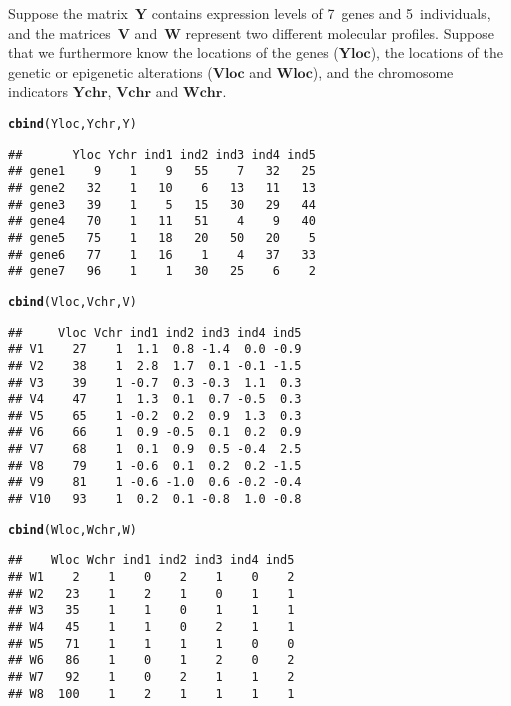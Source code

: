 \documentclass{article}\usepackage[]{graphicx}\usepackage[]{color}
\makeatletter
\newcommand{\hlstd}[1]{\textcolor[rgb]{0.345,0.345,0.345}{#1}}%
\newcommand{\hlkwd}[1]{\textcolor[rgb]{0.737,0.353,0.396}{\textbf{#1}}}%
\newenvironment{kframe}{%
 \def\at@end@of@kframe{}%
 \ifinner\ifhmode%
  \def\at@end@of@kframe{\end{minipage}}%
  \begin{minipage}{\columnwidth}%
 \fi\fi%
 \def\FrameCommand##1{\hskip\@totalleftmargin \hskip-\fboxsep
 \colorbox{shadecolor}{##1}\hskip-\fboxsep
     \hskip-\linewidth \hskip-\@totalleftmargin \hskip\columnwidth}%
 \MakeFramed {\advance\hsize-\width
   \@totalleftmargin\z@ \linewidth\hsize
   \@setminipage}}%
 {\par\unskip\endMakeFramed%
 \at@end@of@kframe}
\newenvironment{knitrout}{}{} %
\makeatother
\begin{document}
Suppose the matrix~$\boldsymbol{Y}$ contains expression levels of 7~genes and 5~individuals, and the matrices~$\boldsymbol{V}$ and~$\boldsymbol{W}$ represent two different molecular profiles. Suppose that we furthermore know the locations of the genes ($\boldsymbol{Yloc}$), the locations of the genetic or epigenetic alterations ($\boldsymbol{Vloc}$ and $\boldsymbol{Wloc}$), and the chromosome indicators $\boldsymbol{Ychr}$, $\boldsymbol{Vchr}$ and $\boldsymbol{Wchr}$.
\begin{knitrout}
\color{fgcolor}\begin{kframe}
\begin{alltt}
\hlkwd{cbind}\hlstd{(Yloc,Ychr,Y)}
\end{alltt}
\begin{verbatim}
##       Yloc Ychr ind1 ind2 ind3 ind4 ind5
## gene1    9    1    9   55    7   32   25
## gene2   32    1   10    6   13   11   13
## gene3   39    1    5   15   30   29   44
## gene4   70    1   11   51    4    9   40
## gene5   75    1   18   20   50   20    5
## gene6   77    1   16    1    4   37   33
## gene7   96    1    1   30   25    6    2
\end{verbatim}
\begin{alltt}
\hlkwd{cbind}\hlstd{(Vloc,Vchr,V)}
\end{alltt}
\begin{verbatim}
##     Vloc Vchr ind1 ind2 ind3 ind4 ind5
## V1    27    1  1.1  0.8 -1.4  0.0 -0.9
## V2    38    1  2.8  1.7  0.1 -0.1 -1.5
## V3    39    1 -0.7  0.3 -0.3  1.1  0.3
## V4    47    1  1.3  0.1  0.7 -0.5  0.3
## V5    65    1 -0.2  0.2  0.9  1.3  0.3
## V6    66    1  0.9 -0.5  0.1  0.2  0.9
## V7    68    1  0.1  0.9  0.5 -0.4  2.5
## V8    79    1 -0.6  0.1  0.2  0.2 -1.5
## V9    81    1 -0.6 -1.0  0.6 -0.2 -0.4
## V10   93    1  0.2  0.1 -0.8  1.0 -0.8
\end{verbatim}
\begin{alltt}
\hlkwd{cbind}\hlstd{(Wloc,Wchr,W)}
\end{alltt}
\begin{verbatim}
##    Wloc Wchr ind1 ind2 ind3 ind4 ind5
## W1    2    1    0    2    1    0    2
## W2   23    1    2    1    0    1    1
## W3   35    1    1    0    1    1    1
## W4   45    1    1    0    2    1    1
## W5   71    1    1    1    1    0    0
## W6   86    1    0    1    2    0    2
## W7   92    1    0    2    1    1    2
## W8  100    1    2    1    1    1    1
\end{verbatim}
\end{kframe}
\end{knitrout}
\end{document}
